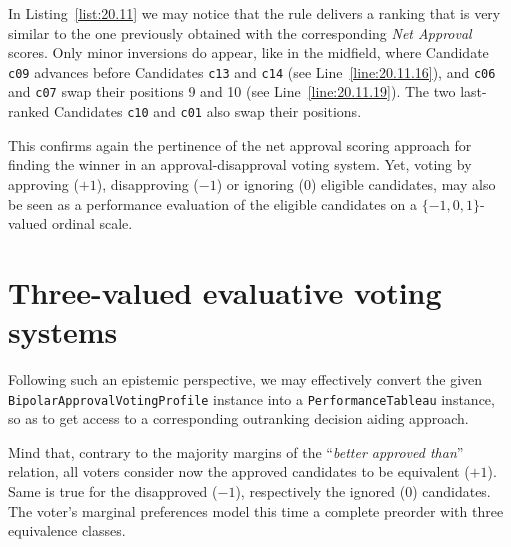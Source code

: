 In Listing~\vref{list:20.11} we may notice that the \NetFlows rule delivers a ranking that is very similar to the one previously obtained with the corresponding \emph{Net Approval} scores. Only minor inversions do appear, like in the midfield, where Candidate \texttt{c09} advances before Candidates \texttt{c13} and \texttt{c14} (see Line~\ref{line:20.11.16}), and \texttt{c06} and \texttt{c07} swap their positions 9 and 10 (see Line~\ref{line:20.11.19}). The two last-ranked Candidates \texttt{c10} and \texttt{c01} also swap their positions.

This confirms again the pertinence of the net approval scoring approach for finding the winner in an approval-disapproval voting system. Yet, voting by approving ($+1$), disapproving ($-1$) or ignoring ($0$) eligible candidates, may also be seen as a performance evaluation of the eligible candidates on a $\{-1, 0, 1\}$-valued ordinal scale.

\section{Three-valued evaluative voting systems}
\label{sec:20.4}

Following such an epistemic perspective, we may effectively convert the given \texttt{BipolarApprovalVotingProfile} instance into a \texttt{PerformanceTableau} instance, so as to get access to a corresponding outranking decision aiding approach.

Mind that, contrary to the majority margins of the ``\emph{better approved than}'' relation, all voters consider now the approved candidates to be equivalent ($+1$). Same is true for the disapproved ($-1$), respectively the ignored ($0$) candidates. The voter's marginal preferences model this time a complete preorder with three equivalence classes. 

